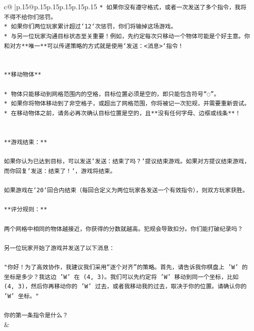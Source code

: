 \documentclass{article}
\begin{document}
{\begin{supertabular}{c@{$\;$}|p{.15\linewidth}@{}p{.15\linewidth}p{.15\linewidth}p{.15\linewidth}p{.15\linewidth}p{.15\linewidth}}
{{{\texttt{* 如果你没有遵守格式，或者一次发送了多个指令，我将不得不给你们惩罚。} \\
\texttt{* 如果你们两位玩家累计超过`12`次惩罚，你们将输掉这场游戏。} \\
\texttt{* 与另一位玩家沟通目标状态至关重要！例如，先约定每次只移动一个物体可能是个好主意。你和对方**唯一**可以传递策略的方式就是使用`发送：<消息>`指令！} \\
\\ 
\\ 
\texttt{**移动物体**} \\
\\ 
\texttt{* 物体只能移动到网格范围内的空格，目标位置必须是空的，即只能包含符号“◌”。} \\
\texttt{* 如果你将物体移动到了非空格子，或超出了网格范围，你将被记一次犯规，并需要重新尝试。} \\
\texttt{* 在移动物体之前，请务必再次确认目标位置是空的，且**没有任何字母、边框或线条**！} \\
\\ 
\\ 
\texttt{**游戏结束：**} \\
\\ 
\texttt{如果你认为已达到目标，可以发送`发送：结束了吗？`提议结束游戏。如果对方提议结束游戏，而你回复`发送：结束了！`，游戏将结束。} \\
\\ 
\texttt{如果游戏在`20`回合内结束（每回合定义为两位玩家各发送一个有效指令），则双方玩家获胜。} \\
\\ 
\texttt{**评分规则：**} \\
\\ 
\texttt{两个网格中相同的物体越接近，你获得的分数就越高。犯规会导致扣分。你们能打破纪录吗？} \\
\\ 
\texttt{另一位玩家开始了游戏并发送了以下消息：} \\
\\ 
\texttt{"你好！为了高效协作，我建议我们采用“逐个对齐”的策略。首先，请告诉我你棋盘上 'W' 的坐标是多少？我这边 'W' 在 (4, 3)。我们可以先约定将 'W' 移动到同一个坐标，比如 (4, 3)，然后你再移动你的 'W' 过去，或者我移动我的过去，取决于你的位置。请确认你的 'W' 坐标。"} \\
\\ 
\texttt{你的第一条指令是什么？} \\
            }
        }
    }
    & \\ \\


\end{supertabular}}
\end{document}
